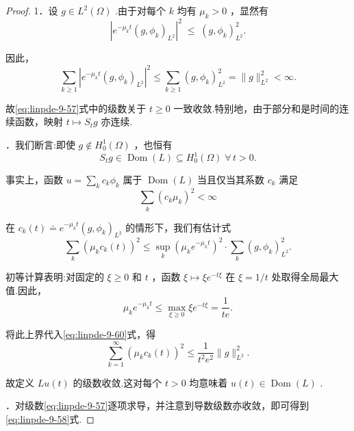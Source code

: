 \begin{proof}
1．设 $g \in  {L}^{2}\left( \Omega \right)$ .由于对每个 $k$ 均有 ${\mu }_{k} > 0$ ，显然有
\[
{\left| {e}^{-{\mu }_{k}t}{\left( g,{\phi }_{k}\right) }_{{L}^{2}}\right| }^{2}\; \leq  \;{\left( g,{\phi }_{k}\right) }_{{L}^{2}}^{2}.
\]

因此，
\[
\sum_{{k \geq  1}}{\left| {e}^{-{\mu }_{k}t}{\left( g,{\phi }_{k}\right) }_{{L}^{2}}\right| }^{2} \leq  \sum_{{k \geq  1}}{\left( g,{\phi }_{k}\right) }_{{L}^{2}}^{2} = \| g{\| }_{{L}^{2}}^{2} < \infty .
\]

故\eqref{eq:linpde-9-57}式中的级数关于 $t \geq  0$ 一致收敛.特别地，由于部分和是时间的连续函数，映射 $t \mapsto  {S}_{t}g$ 亦连续.

．我们断言:即使 $g \notin  {H}_{0}^{1}\left( \Omega \right)$ ，也恒有
\begin{equation}\tag{9.59}\label{eq:linpde-9-59}
{S}_{t}g \in  \operatorname{Dom}\left( L\right)  \subseteq  {H}_{0}^{1}\left( \Omega \right) \;\forall\,t > 0.
\end{equation}

事实上，函数 $u = \sum_{k}{c}_{k}{\phi }_{k}$ 属于 $\operatorname{Dom}\left( L\right)$ 当且仅当其系数 ${c}_{k}$ 满足
\[
\sum_{k}{\left( {c}_{k}{\mu }_{k}\right) }^{2} < \infty
\]

在 ${c}_{k}\left( t\right)  \doteq  {e}^{-{\mu }_{k}t}{\left( g,{\phi }_{k}\right) }_{{L}^{2}}$ 的情形下，我们有估计式
\begin{equation}\tag{9.60}\label{eq:linpde-9-60}
\sum_{k}{\left( {\mu }_{k}{c}_{k}\left( t\right) \right) }^{2} \leq  \mathop{\sup }\limits_{k}{\left( {\mu }_{k}{e}^{-{\mu }_{k}t}\right) }^{2} \cdot  \sum_{k}{\left( g,{\phi }_{k}\right) }_{{L}^{2}}^{2}.
\end{equation}

初等计算表明:对固定的 $\xi  \geq  0$ 和 $t$ ，函数 $\xi  \mapsto  \xi {e}^{-{t\xi }}$ 在 $\xi  = 1/t$ 处取得全局最大值.因此，
\[
{\mu }_{k}{e}^{-{\mu }_{k}t} \leq  \mathop{\max }\limits_{{\xi  \geq  0}}\xi {e}^{-{t\xi }} = \frac{1}{te}.
\]

将此上界代入\eqref{eq:linpde-9-60}式，得
\[
\sum_{{k = 1}}^{\infty }{\left( {\mu }_{k}{c}_{k}\left( t\right) \right) }^{2} \leq  \frac{1}{{t}^{2}{e}^{2}}\| g{\| }_{{L}^{2}}^{2}.
\]

故定义 ${Lu}\left( t\right)$ 的级数收敛.这对每个 $t > 0$ 均意味着 $u\left( t\right)  \in  \operatorname{Dom}\left( L\right)$ .

．对级数\eqref{eq:linpde-9-57}逐项求导，并注意到导数级数亦收敛，即可得到\eqref{eq:linpde-9-58}式.
\end{proof}

